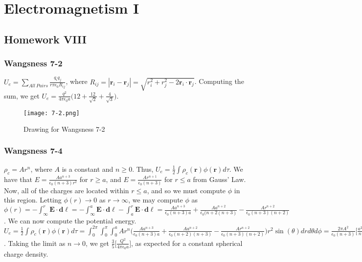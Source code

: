 \documentclass[crop=false,class=article,oneside]{standalone}
\begin{document}
    \ifx\ifemagi\undefined
        \section*{Electromagnetism I}
        \setcounter{section}{8}
        \renewcommand\thesubfigure{%
            \arabic{section}.\arabic{figure}.\arabic{subfigure}%
        }
    \fi
    \subsection{Homework VIII}
        \subsubsection{Wangsness 7-2}
        $U_e = \underset{All\ Pairs}\sum\frac{q_i q_j}{r\pi \epsilon_0 R_{ij}}$, where $R_{ij} = |\mathbf{r}_i-\mathbf{r}_j| = \sqrt{r_i^2+r_j^2 -2\mathbf{r}_i\cdot \mathbf{r}_j}$. Computing the sum, we get $U_e = \frac{q^2}{4\pi \epsilon_0 a}\big(12 + \frac{12}{\sqrt{2}}+\frac{4}{\sqrt{3}}\big)$.
        \begin{figure}[htbp]
            \centering
            {\texttt{[image: 7-2.png]}}
            \caption{Drawing for Wangsness 7-2}
        \end{figure}
        \subsubsection{Wangsness 7-4}
        $\rho_c = Ar^n$, where $A$ is a constant and $n\geq 0$. Thus, $U_e = \frac{1}{2} \int \rho_c(\mathbf{r})\phi(\mathbf{r})d\tau$. We have that $E = \frac{Aa^{n+3}}{\epsilon_0 (n+3)r^2}$ for $r\geq a$, and $E=\frac{Ar^{n+1}}{\epsilon_0(n+3)}$ for $r\leq a$ from Gauss' Law. Now, all of the charges are located within $r\leq a$, and so we must compute $\phi$ in this region. Letting $\phi(r)\rightarrow 0$ as $r\rightarrow \infty$, we may compute $\phi$ as $\phi(r) = -\int_{\infty}^{r}\mathbf{E}\cdot \mathbf{d\ell} = -\int_{\infty}^{a} \mathbf{E}\cdot \mathbf{d\ell} - \int_{a}^{r}\mathbf{E}\cdot \mathbf{d\ell} = \frac{Aa^{n+3}}{\epsilon_0(n+3)a}+\frac{Aa^{n+2}}{\epsilon_0(n+2(n+3)}-\frac{Ar^{n+2}}{\epsilon_0(n+3)(n+2)}$. We can now compute  the potential energy. $U_e =\frac{1}{2}\int \rho_c(\mathbf{r})\phi(\mathbf{r})d\tau = \int_{0}^{2\pi} \int_{0}^{\pi}\int_{0}^{a} A r^n \bigg(\frac{Aa^{n+3}}{\epsilon_0(n+3)a}+\frac{Aa^{n+2}}{\epsilon_0(n+2)(n+3)}-\frac{Ar^{n+2}}{\epsilon_0(n+3)(n+2)}\bigg)r^2 \sin(\theta)dr d\theta d\phi = \frac{2\pi A^2}{\epsilon_0 (n+3)}\bigg[\frac{a^{2n+5}}{n+3}+\frac{a^{2n+5}}{(n+2)(n+3)}-\frac{a^{2n+5}}{(n+2)(2n+5)}\bigg]$. Taking the limit as $n\rightarrow 0$, we get $\frac{3}{5}\bigg[\frac{Q^2}{4\pi \epsilon_0 a}\bigg]$, as expected for a constant spherical charge density.
\end{document}
